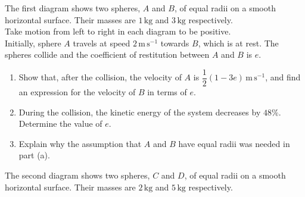 \documentclass[leqno]{article}
\begin{document}
\begin{enumerate}[
  label=\textbf{\arabic*.},
  leftmargin=*,
  topsep=0pt,
  partopsep=0pt,
  parsep=0pt
]
The first diagram shows two spheres, $A$ and $B$, of equal radii on a smooth horizontal surface. Their masses are $1\,\mathrm{kg}$ and $3\,\mathrm{kg}$ respectively. \\

Take motion from left to right in each diagram to be positive. \\

Initially, sphere $A$ travels at speed $2\,\mathrm{m}\,\mathrm{s}^{-1}$ towards $B$, which is at rest. The spheres collide and the coefficient of restitution between $A$ and $B$ is $e$. \\
\begin{enumerate}[label=\textbf{(\alph*)}]
  \item Show that, after the collision, the velocity of $A$ is $\dfrac{1}{2}(1-3e)\,\mathrm{m}\,\mathrm{s}^{-1}$, and find an expression for the velocity of $B$ in terms of $e$.  \\
  \item During the collision, the kinetic energy of the system decreases by $48\%$. Determine the value of $e$.  \\
  \item Explain why the assumption that $A$ and $B$ have equal radii was needed in part (a).  \\
\end{enumerate}


\begin{figure}[H]
    \centering
{}
\end{figure}


The second diagram shows two spheres, $C$ and $D$, of equal radii on a smooth horizontal surface. Their masses are $2\,\mathrm{kg}$ and $5\,\mathrm{kg}$ respectively. \\


\end{enumerate}
\end{document}

